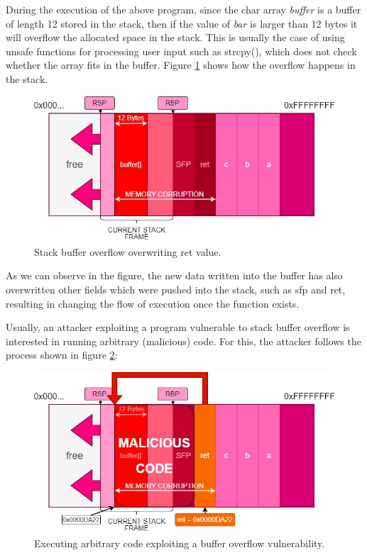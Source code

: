 \documentclass[12pt]{report} %
\begin{document}
During the execution of the above program, since the char array \textit{buffer} is a buffer of length 12 stored in the stack, then if the value of \textit{bar} is larger than 12 bytes it will overflow the allocated space in the stack. This is usually the case of using unsafe functions for processing user input such as strcpy(), which does not check whether the array fits in the buffer. Figure \ref{fig:buffer_overflow} shows how the overflow happens in the stack.

\begin{figure}[H]
	\centering
	\includegraphics[width=15cm]{buffer_overflow.jpg}
	\caption{Stack buffer overflow overwriting ret value.}
	\label{fig:buffer_overflow}
\end{figure}

As we can observe in the figure, the new data written into the buffer has also overwritten other fields which were pushed into the stack, such as sfp and ret, resulting in changing the flow of execution once the function exists.

Usually, an attacker exploiting a program vulnerable to stack buffer overflow is interested in running arbitrary (malicious) code. For this, the attacker follows the process shown in figure \ref{fig:buffer_overflow_shellcode}:

\begin{figure}[H]
	\centering
	\includegraphics[width=15cm]{buffer_overflow_shellcode.jpg}
	\caption{Executing arbitrary code exploiting a buffer overflow vulnerability.}
	\label{fig:buffer_overflow_shellcode}
\end{figure}
\end{document}
